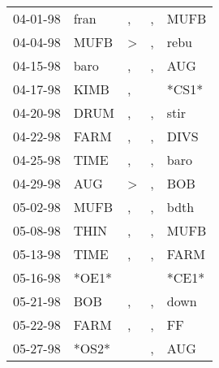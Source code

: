 \begin{supertabular}{p{0.07\textwidth}p{0.06\textwidth}p{0.02\textwidth}p{0.02\textwidth}p{0.06\textwidth}}
 04-01-98\textsuperscript{} &           fran\textsuperscript{} &             , &             , &  MUFB\textsuperscript{} \\
 04-04-98\textsuperscript{} &           MUFB\textsuperscript{} &  \textgreater &             , &  rebu\textsuperscript{} \\
 04-15-98\textsuperscript{} &           baro\textsuperscript{} &             , &             , &   AUG\textsuperscript{} \\
 04-17-98\textsuperscript{} &           KIMB\textsuperscript{} &             , &               &                   *CS1* \\
 04-20-98\textsuperscript{} &           DRUM\textsuperscript{} &             , &             , &  stir\textsuperscript{} \\
 04-22-98\textsuperscript{} &           FARM\textsuperscript{} &             , &             , &  DIVS\textsuperscript{} \\
 04-25-98\textsuperscript{} &           TIME\textsuperscript{} &             , &             , &  baro\textsuperscript{} \\
 04-29-98\textsuperscript{} &            AUG\textsuperscript{} &  \textgreater &             , &   BOB\textsuperscript{} \\
 05-02-98\textsuperscript{} &           MUFB\textsuperscript{} &             , &             , &  bdth\textsuperscript{} \\
 05-08-98\textsuperscript{} &           THIN\textsuperscript{} &             , &             , &  MUFB\textsuperscript{} \\
 05-13-98\textsuperscript{} &           TIME\textsuperscript{} &             , &             , &  FARM\textsuperscript{} \\
 05-16-98\textsuperscript{} &                            *OE1* &               &               &                   *CE1* \\
 05-21-98\textsuperscript{} &            BOB\textsuperscript{} &             , &             , &  down\textsuperscript{} \\
 05-22-98\textsuperscript{} &           FARM\textsuperscript{} &             , &             , &    FF\textsuperscript{} \\
 05-27-98\textsuperscript{} &                            *OS2* &               &             , &   AUG\textsuperscript{} \\

\end{supertabular}
